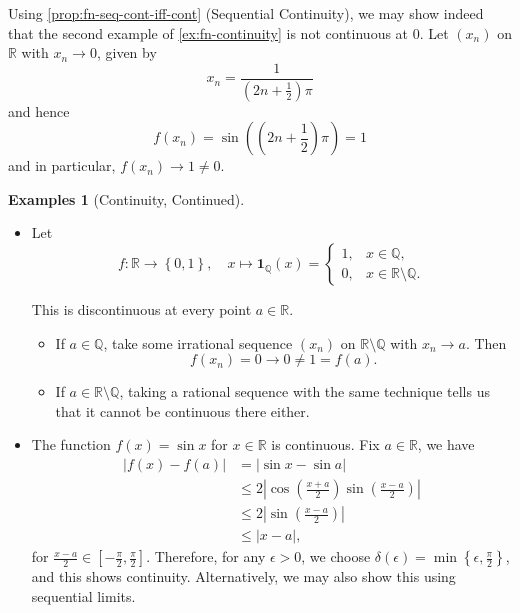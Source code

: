 \documentclass[11pt]{article}
\numberwithin{equation}{section}
\theoremstyle{definition}
\newtheorem{examples}[theorem]{Examples}
\theoremstyle{remark}
\newcommand{\pqty}[1]{\left(#1\right)}
\newcommand{\Bqty}[1]{\left\{#1\right\}}
\newcommand{\abs}[1]{\left|#1\right|}
\newcommand{\ccintv}[2]{[#1,#2]}
\newcommand{\function}[5]{#1:#2\to #3,\quad #4\mapsto #5}
\newcommand{\RR}{\mathbb R}
\newcommand{\QQ}{\mathbb Q}
\newcommand{\indicator}{\mathbf 1}
\begin{document}
Using \autoref{prop:fn-seq-cont-iff-cont} (Sequential Continuity), we may show indeed that the second example of \autoref{ex:fn-continuity} is not continuous at \(0\). Let \(\pqty{x_n}\) on \(\RR\) with \(x_n \to 0\), given by
\[
    x_n = \frac{1}{\pqty{2n + \frac{1}{2}} \pi}
\]
and hence
\[
    f\pqty{x_n} = \sin\pqty{\pqty{2n + \frac{1}{2}} \pi} = 1
\]
and in particular, \(f\pqty{x_n} \to 1 \neq 0\).

\begin{examples}[Continuity, Continued]\label{analysis-unit-0083}
    \label{ex:continuity-continued}%
    \begin{itemize}
        \item Let
        \[
            \function{f}{\RR}{\Bqty{0, 1}}
            {x}{\indicator_{\QQ} \pqty{x} = \begin{cases}
                1, & x \in \QQ, \\
                0, & x \in \RR \setminus \QQ.
            \end{cases}}
        \]

        This is discontinuous at every point \(a \in \RR\).

        \begin{itemize}
            \item If \(a \in \QQ\), take some irrational sequence \(\pqty{x_n}\) on \(\RR \setminus \QQ\) with \(x_n \to a\). Then
            \[
                f\pqty{x_n} = 0 \to 0 \neq 1 = f\pqty{a}.
            \]
            \item If \(a \in \RR \setminus \QQ\), taking a rational sequence with the same technique tells us that it cannot be continuous there either.
        \end{itemize}

        \item The function \(f\pqty{x} = \sin x\) for \(x \in \RR\) is continuous. Fix \(a \in \RR\), we have
        \begin{align*}
            \abs{f\pqty{x} - f\pqty{a}} &= \abs{\sin x - \sin a} \\
            &\leq 2 \abs{\cos \pqty{\frac{x + a}{2}} \sin \pqty{\frac{x - a}{2}}} \\
            &\leq 2 \abs{\sin \pqty{\frac{x - a}{2}}} \\
            &\leq \abs{x - a},
        \end{align*}
        for \(\frac{x - a}{2} \in \ccintv{-\frac{\pi}{2}}{\frac{\pi}{2}}\). Therefore, for any \(\epsilon > 0\), we choose \(\delta\pqty{\epsilon} = \min\Bqty{\epsilon, \frac{\pi}{2}}\), and this shows continuity. Alternatively, we may also show this using sequential limits.
    \end{itemize}
\end{examples}
\end{document}
